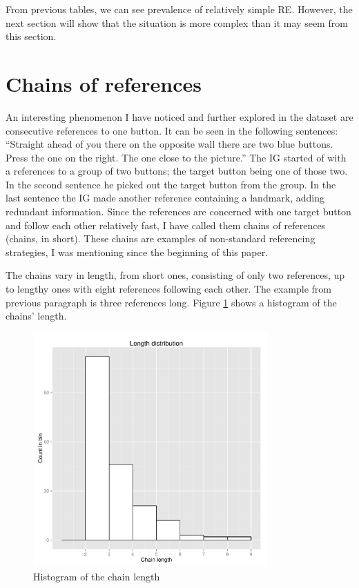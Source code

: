 From previous tables, we can see prevalence of relatively simple RE. However, the next section will show that the situation is more complex than it may seem from this section.

\section{Chains of references}
\label{sec:dataset-chains}
An interesting phenomenon I have noticed and further explored in the dataset are consecutive references to one button. It can be seen in the following sentences: ``Straight ahead of you there on the opposite wall there are two blue buttons. Press the one on the right. The one close to the picture.'' The IG started of with a references to a group of two buttons; the target button being one of those two. In the second sentence he picked out the target button from the group. In the last sentence the IG made another reference containing a landmark, adding redundant information. Since the references are concerned with one target button and follow each other relatively fast, I have called them chains of references (chains, in short). These chains are examples of non-standard referencing strategies, I was mentioning since the beginning of this paper.

The chains vary in length, from short ones, consisting of only two references, up to lengthy ones with eight references following each other. The example from previous paragraph is three references long. Figure \ref{fig:chains_len_histo} shows a histogram of the chains' length.

\begin{figure}[!htbp]
  \centering
	\includegraphics[width=0.8\textwidth]{Images/chains_len_histo}
	\caption{Histogram of the chain length}
	\label{fig:chains_len_histo}
\end{figure}

